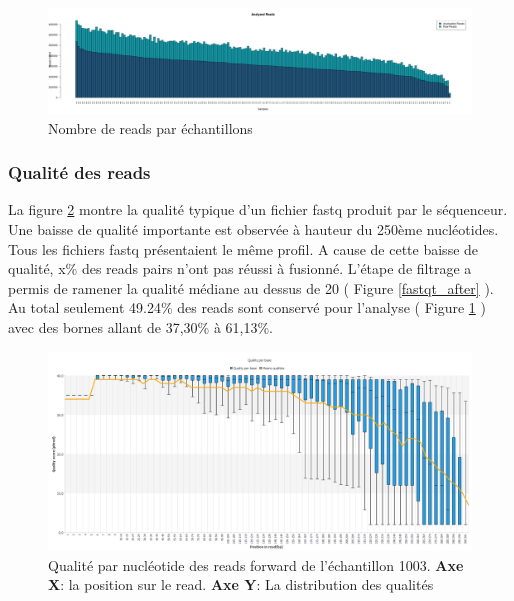 \documentclass[12pt,a4paper]{article}
\begin{document}
\begin{figure}[ht]
\begin{center}
\includegraphics[scale=0.25]{img/pipeline.png}\hfill
\end{center}
\caption{Nombre de reads par échantillons}
\label{readcount}
\end{figure}


\subsubsection{Qualité des reads}
La figure \ref{fastqt} montre la qualité typique d'un fichier fastq produit par le séquenceur. Une baisse de qualité importante est observée à hauteur du 250ème nucléotides. Tous les fichiers fastq présentaient le même profil. 
A cause de cette baisse de qualité, x\% des reads pairs n'ont pas réussi à fusionné. 
L'étape de filtrage a permis de ramener la qualité médiane au dessus de 20 ( Figure \ref{fastqt_after} ).
Au total seulement 49.24\% des reads sont conservé pour l'analyse ( Figure \ref{readcount} ) avec des bornes allant de 37,30\% à 61,13\%.



\begin{figure}[ht]
\begin{center}
\includegraphics[scale=0.45]{img/1003_forward.png}\hfill
\end{center}
\caption{Qualité par nucléotide des reads forward de l'échantillon 1003. \textbf{Axe X}: la position sur le read. \textbf{Axe Y}: La distribution des qualités}
\label{fastqt}
\end{figure}
\end{document}
